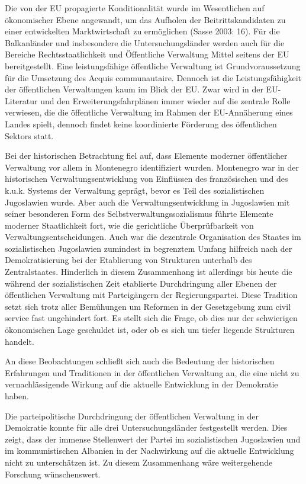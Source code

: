 Die von der EU propagierte Konditionalität wurde im Wesentlichen auf ökonomischer Ebene angewandt, um das Aufholen der Beitrittskandidaten zu einer entwickelten Marktwirtschaft zu ermöglichen (Sasse 2003: 16). Für die Balkanländer und insbesondere die Untersuchungsländer werden auch für die Bereiche Rechtsstaatlichkeit und Öffentliche Verwaltung Mittel seitens der EU bereitgestellt. Eine leistungsfähige öffentliche Verwaltung ist Grundvoraussetzung für die Umsetzung des Acquis communautaire. Dennoch ist die Leistungsfähigkeit der öffentlichen Verwaltungen kaum im Blick der EU. Zwar wird in der EU-Literatur und den Erweiterungsfahrplänen immer wieder auf die zentrale Rolle verwiesen, die die öffentliche Verwaltung im Rahmen der EU-Annäherung eines Landes spielt, dennoch findet keine koordinierte Förderung des öffentlichen Sektors statt. \par
Bei der historischen Betrachtung fiel auf, dass Elemente moderner öffentlicher Verwaltung vor allem in Montenegro identifiziert wurden. Montenegro war in der historischen Verwaltungsentwicklung von Einflüssen des französischen und des k.u.k. Systems der Verwaltung geprägt, bevor es Teil des sozialistischen Jugoslawien wurde. Aber auch die Verwaltungsentwicklung in Jugoslawien mit seiner besonderen Form des Selbstverwaltungssozialismus führte Elemente moderner Staatlichkeit fort, wie die gerichtliche Überprüfbarkeit von Verwaltungsentscheidungen. Auch war die dezentrale Organisation des Staates im sozialistischen Jugoslawien zumindest in begrenztem Umfang hilfreich nach der Demokratisierung bei der Etablierung von Strukturen unterhalb des Zentralstaates. Hinderlich in diesem Zusammenhang ist allerdings bis heute die während der sozialistischen Zeit etablierte Durchdringung aller Ebenen der öffentlichen Verwaltung mit Parteigängern der Regierungspartei. Diese Tradition setzt sich trotz aller Bemühungen um Reformen in der Gesetzgebung zum civil service fast ungehindert fort. Es stellt sich die Frage, ob dies nur der schwierigen ökonomischen Lage geschuldet ist, oder ob es sich um tiefer liegende Strukturen handelt. \par
An diese Beobachtungen schließt sich auch die Bedeutung der historischen Erfahrungen und Traditionen in der öffentlichen Verwaltung an, die eine nicht zu vernachlässigende Wirkung auf die aktuelle Entwicklung in der Demokratie haben. \par
Die parteipolitische Durchdringung der öffentlichen Verwaltung in der Demokratie konnte für alle drei Untersuchungsländer festgestellt werden. Dies zeigt, dass der immense Stellenwert der Partei im sozialistischen Jugoslawien und im kommunistischen Albanien in der Nachwirkung auf die aktuelle Entwicklung nicht zu unterschätzen ist. Zu diesem Zusammenhang wäre weitergehende Forschung wünschenswert. \par
